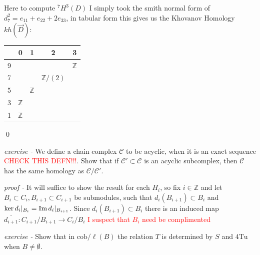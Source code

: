 \documentclass[11pt]{article}
\theoremstyle{definition}
\newcommand{\im}{\text{Im\,}}
\begin{document}
        Here to compute \({}^7H^3(D)\) I simply took the smith normal form of \(d^2_7 = e_{11} + e_{22} + 2e_{33}\), in tabular form this gives us the Khovanov Homology \(kh(\vec{D})\):
        \begin{center}
            \begin{tabular}{|c|c|c|c|c|}
                &0&1&2&3 \\
                \hline
                9&& & &\(\mathbb{Z}\)\\
                \hline
                7& &&\(\mathbb{Z}/(2)\)\\
                \hline
                5&&\(\mathbb{Z}\)&\\
                \hline
                3&\(\mathbb{Z}\)&&\\
                \hline
                1&\(\mathbb{Z}\)& & & \\
                \hline
            \end{tabular}
        \end{center} \qed


    
    \emph{exercise - } We define a chain complex \(\mathcal{C}\) to be acyclic, when it is an exact sequence \textcolor{red}{CHECK THIS DEFN!!!}. Show that if
    \(\mathcal{C}' \subset \mathcal{C}\) is an acyclic subcomplex, then \(\mathcal{C}\) has the same homology as \(\mathcal{C}/\mathcal{C}'\).

    \emph{proof - } It will suffice to show the result for each \(H_i\), so fix \(i \in \mathbb{Z}\) and let \(B_i \subset C_i, B_{i+1} \subset C_{i+1}\) be submodules, such that \(d_i(B_{i+1}) \subset B_i\) and \(\ker d_i\vert_{B_i} = \im d_i\vert_{B_{i+1}}\). Since \(d_i(B_{i+1}) \subset B_i\) there is an induced map \(\overline{d_{i+1}}:C_{i+1}/B_{i+1} \to C_i/B_i\) \textcolor{red}{I suspect that \(B_i\) need be complimented}

    
    \emph{exercise - } Show that in \(\text{cob}/\ell(B)\) the relation \(T\) is determined by \(S\) and \(4\text{Tu}\) when \(B \neq \emptyset\).
\end{document}
